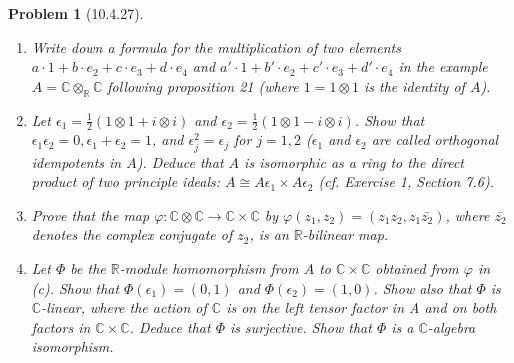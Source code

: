 \documentclass[10pt]{article}
\newcommand{\sk}{\vskip 10mm}
\newcommand{\bb}[1]{\mathbb{#1}}
\theoremstyle{plain}
\newtheorem{problem}{Problem}
\theoremstyle{remark}
\begin{document}
\sk

\begin{problem}[10.4.27]
  \begin{enumerate}
  \item[(a)] Write down a formula for the multiplication of two elements
    $a\cdot 1+b\cdot e_2+c\cdot e_3+d\cdot e_4$ and
    $a'\cdot 1+b'\cdot e_2+c'\cdot e_3+d'\cdot e_4$ in the example
    $A=\bb{C}\otimes_{\bb{R}}\bb{C}$ following proposition 21
    (where $1=1\otimes 1$ is the identity of $A$).
  \item[(b)] Let $\epsilon_1=\frac{1}{2}(1\otimes 1+i\otimes i)$ and
    $\epsilon_2=\frac{1}{2}(1\otimes 1-i\otimes i)$. Show that
    $\epsilon_1\epsilon_2=0,\epsilon_1+\epsilon_2=1$, and
    $\epsilon_j^2=\epsilon_j$ for $j=1,2$ ($\epsilon_1$ and $\epsilon_2$ are
    called orthogonal idempotents in $A$). Deduce that $A$ is isomorphic
    as a ring to the direct product of two principle ideals:
    $A\cong A\epsilon_1\times A\epsilon_2$ (cf. Exercise 1, Section 7.6).
  \item[(c)] Prove that the map
    $\varphi:\bb{C}\otimes\bb{C}\rightarrow\bb{C}\times\bb{C}$ by
    $\varphi(z_1,z_2)=(z_1z_2,z_1\bar{z_2})$, where $\bar{z_2}$
    denotes the complex conjugate of $z_2$, is an $\bb{R}$-bilinear map.
  \item[(d)] Let $\Phi$ be the $\bb{R}$-module homomorphism from $A$ to
    $\bb{C}\times\bb{C}$ obtained from $\varphi$ in (c). Show that
    $\Phi(\epsilon_1)=(0,1)$ and $\Phi(\epsilon_2)=(1,0)$. Show also that $\Phi$
    is $\bb{C}$-linear, where the action of $\bb{C}$ is on the left tensor
    factor in A and on both factors in $\bb{C}\times\bb{C}$. Deduce that
    $\Phi$ is surjective. Show that $\Phi$ is a $\bb{C}$-algebra isomorphism.
  \end{enumerate}
\end{problem}
\end{document}
